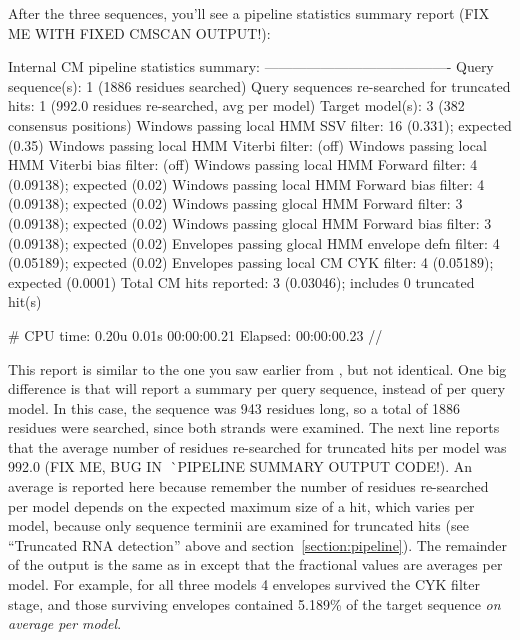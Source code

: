 After the three sequences, you'll see a pipeline statistics summary
report (FIX ME WITH FIXED CMSCAN OUTPUT!):

\begin{sreoutput}
Internal CM pipeline statistics summary:
----------------------------------------
Query sequence(s):                                               1  (1886 residues searched)
Query sequences re-searched for truncated hits:                  1  (992.0 residues re-searched, avg per model)
Target model(s):                                                 3  (382 consensus positions)
Windows   passing  local HMM SSV           filter:              16  (0.331); expected (0.35)
Windows   passing  local HMM Viterbi       filter:                  (off)
Windows   passing  local HMM Viterbi  bias filter:                  (off)
Windows   passing  local HMM Forward       filter:               4  (0.09138); expected (0.02)
Windows   passing  local HMM Forward  bias filter:               4  (0.09138); expected (0.02)
Windows   passing glocal HMM Forward       filter:               3  (0.09138); expected (0.02)
Windows   passing glocal HMM Forward  bias filter:               3  (0.09138); expected (0.02)
Envelopes passing glocal HMM envelope defn filter:               4  (0.05189); expected (0.02)
Envelopes passing  local CM  CYK           filter:               4  (0.05189); expected (0.0001)
Total CM hits reported:                                          3  (0.03046); includes 0 truncated hit(s)

# CPU time: 0.20u 0.01s 00:00:00.21 Elapsed: 00:00:00.23
//
\end{sreoutput}

This report is similar to the one you saw earlier from
, but not identical. One big difference is that
 will report a summary per query sequence, instead of per
query model. In this case, the sequence was 943 residues long, so a
total of 1886 residues were searched, since both strands were
examined. The next line reports that the average number of residues
re-searched for truncated hits per model was 992.0 (FIX ME, BUG IN
^^^^^ PIPELINE SUMMARY OUTPUT CODE!). An average is reported here
because remember the number of residues re-searched per model depends
on the expected maximum size of a hit, which varies per model, because
only sequence terminii are examined for truncated hits (see
``Truncated RNA detection'' above and section~\ref{section:pipeline}).
The remainder of the output is the same as in  except
that the fractional values are averages per model. For example, for
all three models 4 envelopes survived the CYK filter stage, and those
surviving envelopes contained 5.189\% of the target sequence \emph{on
  average per model}.

